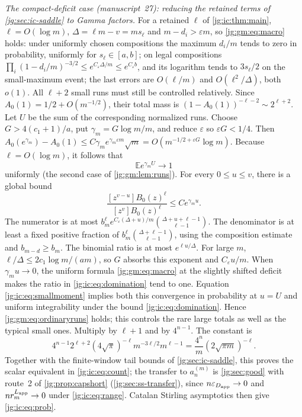 \documentclass[11pt,a4paper]{article}
\theoremstyle{definition}\newaliascnt{definition}{theorem}
\theoremstyle{remark}\newaliascnt{remark}{theorem}
\newcommand{\eps}{\varepsilon}
\newcommand{\ljE}{\mathbb E}
\begin{document}
\emph{The compact-deficit case (manuscript~27): reducing the retained terms of
\cref{jg:sec:ic-saddle} to Gamma factors.} For a retained $\ell$ of
\cref{jg:ic:thm:main}, $\ell=O(\log m)$, $\Delta=\ell m-v=ms_\ell$ and
$m-d_i>\varepsilon m$, so \eqref{jg:gm:eq:macro} holds: under uniformly chosen
compositions the maximum $d_i/m$ tends to zero in probability, uniformly for
$s_\ell\in[a,b]$; on legal compositions
$\prod_i(1-d_i/m)^{-3/2}\le e^{C_\varepsilon\Delta/m}\le e^{C_\varepsilon b}$, and
its logarithm tends to $3s_\ell/2$ on the small-maximum event; the last errors
are $O(\ell/m)$ and $O(\ell^2/\Delta)$, both $o(1)$. All $\ell+2$ small runs
must still be controlled relatively. Since $A_0(1)=1/2+O(m^{-1/2})$, their
total mass is $(1-A_0(1))^{-\ell-2}\sim2^{\ell+2}$. Let $U$ be the sum of the
corresponding normalized runs. Choose $G>4(c_1+1)/a$, put
$\gamma_m=G\log m/m$, and reduce $\varepsilon$ so $\varepsilon G<1/4$. Then
$A_0(e^{\gamma_m})-A_0(1)\le C\gamma_me^{\gamma_m\varepsilon m}\sqrt m
=O(m^{-1/2+\varepsilon G}\log m)$. Because $\ell=O(\log m)$, it follows that
\begin{equation}\label{jg:ic:eq:smallmoment}
 \ljE e^{\gamma_m U}\longrightarrow1
\end{equation}
uniformly (the second case of \cref{jg:gm:lem:runs}). For every $0\le u\le v$,
there is a global bound
\begin{equation}\label{jg:ic:eq:domination}
 \frac{[z^{v-u}]B_0(z)^\ell}{[z^v]B_0(z)^\ell}
 \le C e^{\gamma_m u}.
\end{equation}
The numerator is at most
$b_m^\ell e^{C_\varepsilon(\Delta+u)/m}\binom{\Delta+u+\ell-1}{\ell-1}$. The
denominator is at least a fixed positive fraction of
$b_m^\ell\binom{\Delta+\ell-1}{\ell-1}$, using the composition estimate and
$b_{m-d}\ge b_m$. The binomial ratio is at most $e^{\ell u/\Delta}$. For large
$m$, $\ell/\Delta\le2c_1\log m/(am)$, so $G$ absorbs this exponent and
$C_\varepsilon u/m$. When $\gamma_mu\to0$, the uniform formula
\eqref{jg:gm:eq:macro} at the slightly shifted deficit makes the ratio in
\eqref{jg:ic:eq:domination} tend to one. Equation \eqref{jg:ic:eq:smallmoment}
implies both this convergence in probability at $u=U$ and uniform integrability
under the bound \eqref{jg:ic:eq:domination}. Hence \eqref{jg:gm:eq:ordinaryruns}
holds; this controls the rare large totals as well as the typical small ones.
Multiply by $\ell+1$ and by $4^{n-1}$. The constant is
\[
 4^{n-1}2^{\ell+2}(4\sqrt\pi)^{-\ell}m^{-3\ell/2}m^{\ell-1}
 =\frac{4^n}{m}(2\sqrt{\pi m})^{-\ell}.
\]
Together with the finite-window tail bounds of \cref{jg:sec:ic-saddle}, this
proves the scalar equivalent in \eqref{jg:ic:eq:count}; the transfer to
$a_n^{(m)}$ is \cref{jg:sec:good} with route~2 of \cref{jg:prop:capshort}
(\cref{jg:sec:ss-transfer}), since $n\eps_{D_{\rm app}}\to0$ and
$nr_m^{L_{\rm app}}\to0$ under \eqref{jg:ic:eq:range}. Catalan Stirling
asymptotics then give \eqref{jg:ic:eq:prob}.
\end{document}
